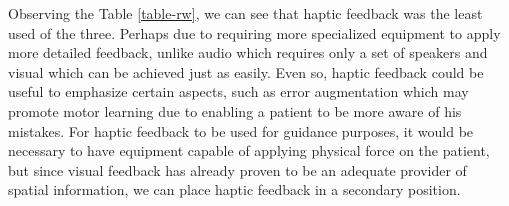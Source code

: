 
Observing the Table \ref{table-rw}, we can see that haptic feedback was 
the least used of the three. Perhaps due to requiring more specialized equipment to apply more 
detailed feedback, unlike audio which requires only a set of speakers and visual which can be 
achieved just as easily. Even so, haptic feedback could be useful to emphasize certain aspects, 
such as error augmentation \cite{Causo2011} which may promote motor learning due to enabling a 
patient to be more aware of his mistakes\cite{Sigrist2013}.
For haptic feedback to be used for guidance purposes, it would be necessary to have equipment 
capable of applying physical force on the patient, but since visual feedback has already proven 
to be an adequate provider of spatial information, we can place haptic feedback in a secondary 
position.
 
